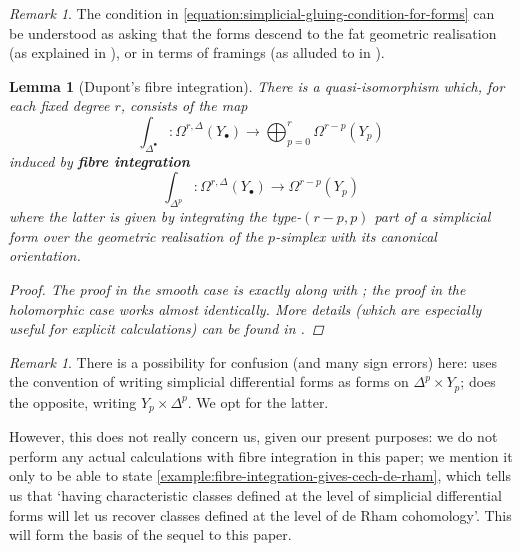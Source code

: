 \documentclass[11pt,fleqn]{article}
\theoremstyle{plain}
\newtheorem{lemma}[theorem]{Lemma}
\theoremstyle{definition}
\theoremstyle{remark}
\newtheorem{remark}[theorem]{Remark}
\numberwithin{equation}{theorem}
\newcommand{\define}[1]{\textbf{#1}}
\begin{document}
        \begin{remark}
            The condition in \cref{equation:simplicial-gluing-condition-for-forms} can be understood as asking that the forms descend to the fat geometric realisation (as explained in \cite{Dupont1976}), or in terms of framings (as alluded to in \cite{Hosgood2020}).
        \end{remark}

        \begin{lemma}[Dupont's fibre integration]\label{lemma:dupont's-fibre-integration}
            There is a \emph{quasi-isomorphism} which, for each fixed degree $r$, consists of the map
            \begin{equation}
                \int_{\Delta^\bullet}\colon \Omega^{r,\Delta}({Y_\bullet})
                \to
                \bigoplus_{p=0}^r\Omega^{r-p}({Y_p})
            \end{equation}
            induced by \define{fibre integration}
            \begin{equation}
                \int_{\Delta^p}\colon\Omega^{r,\Delta}({Y_\bullet})
                \to
                \Omega^{r-p}({Y_p})
            \end{equation}
            where the latter is given by integrating the type-$(r-p,p)$ part of a simplicial form over the geometric realisation of the $p$-simplex with its canonical orientation.
            \begin{proof}
                The proof in the \emph{smooth} case is exactly \cite[Theorem~2.3]{Dupont1976} along with \cite[Remark~1, §2]{Dupont1976}; the proof in the holomorphic case works almost identically.
                More details (which are especially useful for explicit calculations) can be found in \cite{Hosgood2020}.
            \end{proof}
        \end{lemma}

        \begin{remark}
            There is a possibility for confusion (and many sign errors) here: \cite{Dupont1976} uses the convention of writing simplicial differential forms as forms on $\Delta^p\times Y_{p}$; \cite{Green1980} does the opposite, writing $Y_{p}\times\Delta^p$.
            We opt for the latter.

            However, this does not really concern us, given our present purposes: we do not perform any actual calculations with fibre integration in this paper; we mention it only to be able to state \cref{example:fibre-integration-gives-cech-de-rham}, which tells us that `having characteristic classes defined at the level of simplicial differential forms will let us recover classes defined at the level of de Rham cohomology'.
            This will form the basis of the sequel to this paper.
        \end{remark}
\end{document}
